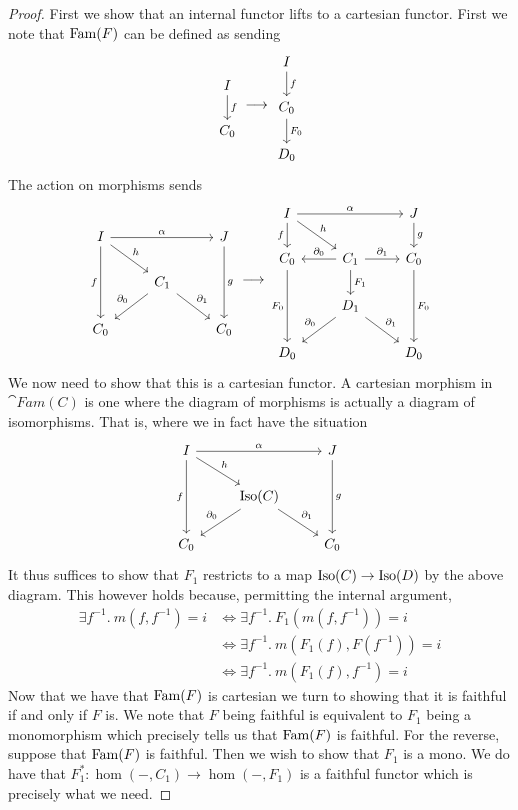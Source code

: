 \begin{proof}
  First we show that an internal functor lifts to a cartesian
  functor. First we note that $\operatorname{Fam}(F)$ can be defined as sending
  \[
    \begin{tikzcd}
      I\ar[d, "f"] \\
      C_0
    \end{tikzcd} \longrightarrow
    \begin{tikzcd}
      I\ar[d, "f"] \\
      C_0 \ar[d, "F_0"]\\
      D_0
    \end{tikzcd}
  \]
  The action on morphisms sends
  \[
    \begin{tikzcd}
      I \ar[dd, swap, "f"] \ar[rd, "h"] \ar[rr, "\alpha"] && J \ar[dd, "g"]\\
      & C_1 \ar[dl, swap, "\partial_0"] \ar[dr, "\partial_1"] &\\
      C_0 && C_0
    \end{tikzcd} \longrightarrow
    \begin{tikzcd}
      I \ar[d, swap, "f"] \ar[rd, "h"] \ar[rr, "\alpha"] && J \ar[d, "g"]\\
      C_0 \ar[dd, swap, "F_0"] &
      C_1 \ar[d, "F_1"] \ar[l, swap, "\partial_0"] \ar[r, "\partial_1"] &
      C_0 \ar[dd, "F_0"]\\
      & D_1 \ar[dl, swap, "\partial_0"] \ar[dr, "\partial_1"] &\\
      D_0 && D_0
    \end{tikzcd}
  \]
  We now need to show that this is a cartesian functor. A cartesian
  morphism in $\cat{Fam}(C)$ is one where the diagram of morphisms is
  actually a diagram of isomorphisms. That is, where we in fact have
  the situation
  \[
    \begin{tikzcd}
      I \ar[dd, swap, "f"] \ar[rd, "h"] \ar[rr, "\alpha"] && J \ar[dd, "g"]\\
      & \isos(C) \ar[dl, swap, "\partial_0"] \ar[dr, "\partial_1"] &\\
      C_0 && C_0
    \end{tikzcd}
  \]
  It thus suffices to show that $F_1$ restricts to a map
  $\operatorname{Iso}(C) \to \operatorname{Iso}(D)$ by the above diagram. This however holds
  because, permitting the internal argument,
  \begin{align*}
    \exists f^{-1}.\ m(f, f^{-1}) = i
    &\iff \exists f^{-1}.\ F_1(m(f, f^{-1})) = i\\
    &\iff \exists f^{-1}.\ m(F_1(f), F(f^{-1})) = i\\
    &\iff \exists f^{-1}.\ m(F_1(f), f^{-1}) = i
  \end{align*}
  Now that we have that $\operatorname{Fam}(F)$ is cartesian we turn to showing
  that it is faithful if and only if $F$ is. We note that $F$ being
  faithful is equivalent to $F_1$ being a monomorphism which precisely
  tells us that $\operatorname{Fam}(F)$ is faithful. For the reverse, suppose
  that $\operatorname{Fam}(F)$ is faithful. Then we wish to show that $F_1$ is a
  mono. We do have that $F_1^* : \hom(-, C_1) \to \hom(-, F_1)$ is a
  faithful functor which is precisely what we need.


\end{proof}

